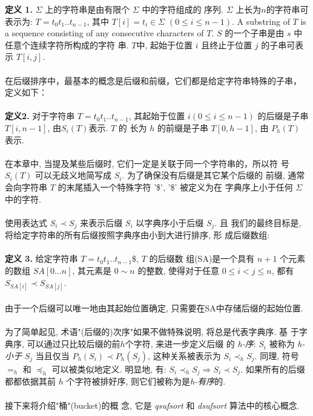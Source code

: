 \documentclass{ws-ijprai}
\begin{document}
\textbf{定义 1.} $\Sigma$ 上的字符串是由有限个 $\Sigma$ 中的字符组成的
序列. $\Sigma$ 上长为$n$的字符串可表示为: $T =
t_0t_1..t_{n-1}$, 其中 $T[i] = t_i \in \Sigma$ $(0 \leq i \leq
n-1)$. A substring of $T$ is a sequence consisting of any consecutive
characters of $T$. $S$ 的一个子串是由 $s$ 中任意个连续字符所构成的字符
串. $T$中, 起始于位置 $i$ 且终止于位置 $j$ 的子串可表示 $T[i,j]$.\\
\\
在后缀排序中，最基本的概念是后缀和前缀，它们都是给定字符串特殊的子串，
定义如下：\\
\\
\textbf{定义2.} 对于字符串 $T = t_0t_1..t_{n-1}$, 其起始于位置
$i(0 \leq i \leq n-1)$ 的后缀是子串 $T[i,n-1]$, 由$S_i(T)$表示.  $T$ 的
长为 $h$ 的前缀是子串 $T[0,h-1]$, 由 $P_h(T)$ 表示.\\
\\
在本章中, 当提及某些后缀时, 它们一定是关联于同一个字符串的，所以符
号 $S_i(T)$ 可以无歧义地简写成 $S_i$. 为了确保没有后缀是其它某个后缀的
前缀, 通常会向字符串 $T$ 的末尾插入一个特殊字符 '\$', '\$' 被定义为在
字典序上小于任何 $\Sigma$ 中的字符.\\
\\
使用表达式 $S_i \prec S_j$ 来表示后缀 $S_i$ 以字典序小于后缀 $S_j$. 且
我们的最终目标是, 将给定字符串的所有后缀按照字典序由小到大进行排序, 形
成后缀数组:\\
\\
\textbf{定义 3.} 给定字符串 $T = t_0t_1..t_{n-1}\$$, $T$ 的后缀数
组(SA)是一个具有 $n+1$ 个元素的数组 $SA[0 \dots n]$, 其元素是 $0 \sim
n$ 的整数, 使得对于任意 $0
\leq i < j \leq n$, 都有 $S_{SA[i]} \prec S_{SA[j]}$.\\
\\
由于一个后缀可以唯一地由其起始位置确定, 只需要在SA中存储后缀的起始位置.\\
\\
为了简单起见, 术语"(后缀的)次序"如果不做特殊说明, 将总是代表字典序. 基
于字典序, 可以通过只比较后缀的前$h$个字符, 来进一步定义后缀
的 \emph{h-序}: $S_i$ 被称为 \emph{h-小于} $S_j$ 当且仅当 $P_h(S_i)
\prec P_h(S_j)$, 这种关系被表示为 $S_i \prec_h S_j$.  同理, 符号
$=_h$ 和 $\preceq_h$ 可以被类似地定义. 明显地, 有: $S_i \prec_h S_j
\Longrightarrow S_i \prec S_j$. 如果所有的后缀都都依据其前
$h$ 个字符被排好序, 则它们被称为是\emph{h-有序}的.\\
\\
接下来将介绍"桶"(bucket)的概
念, 它是 \emph{qsufsort} 和 \emph{dsufsort} 算法中的核心概念.\\
\\
\end{document}
